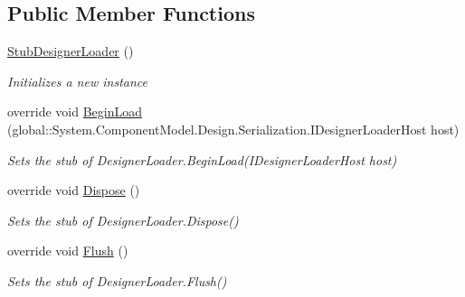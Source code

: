 \subsection*{Public Member Functions}
\begin{DoxyCompactItemize}
\item 
\hyperlink{class_system_1_1_component_model_1_1_design_1_1_serialization_1_1_fakes_1_1_stub_designer_loader_aa08218d924af40aa19e5665ce10e7905}{Stub\-Designer\-Loader} ()
\begin{DoxyCompactList}\small\item\em Initializes a new instance\end{DoxyCompactList}\item 
override void \hyperlink{class_system_1_1_component_model_1_1_design_1_1_serialization_1_1_fakes_1_1_stub_designer_loader_a8aa34dfdb286d27420e1dc7408c9b51d}{Begin\-Load} (global\-::\-System.\-Component\-Model.\-Design.\-Serialization.\-I\-Designer\-Loader\-Host host)
\begin{DoxyCompactList}\small\item\em Sets the stub of Designer\-Loader.\-Begin\-Load(\-I\-Designer\-Loader\-Host host)\end{DoxyCompactList}\item 
override void \hyperlink{class_system_1_1_component_model_1_1_design_1_1_serialization_1_1_fakes_1_1_stub_designer_loader_a01fb253a63f266b00c4b748550f1b045}{Dispose} ()
\begin{DoxyCompactList}\small\item\em Sets the stub of Designer\-Loader.\-Dispose()\end{DoxyCompactList}\item 
override void \hyperlink{class_system_1_1_component_model_1_1_design_1_1_serialization_1_1_fakes_1_1_stub_designer_loader_adf638c25834b8c447d17cf6a392704d5}{Flush} ()
\begin{DoxyCompactList}\small\item\em Sets the stub of Designer\-Loader.\-Flush()\end{DoxyCompactList}\end{DoxyCompactItemize}
